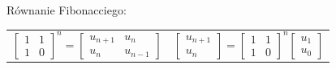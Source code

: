 \documentclass[handout]{beamer}
\theoremstyle{definition}
\theoremstyle{named}
\begin{document}
\begin{frame}{Równanie Fibonacciego:}
\begin{table}[]
\begin{tabular}{c|c}
\begin{equation*}
        \begin{bmatrix}
        1 & 1\\
        1 & 0
        \end{bmatrix}^n
        = 
        \begin{bmatrix}
        u_{n+1} & u_n\\
        u_{n} & u_{n-1}
        \end{bmatrix}

    \end{equation*}
&  
       \begin{equation*}
        \begin{bmatrix}
        u_{n+1} \\
        u_{n}
        \end{bmatrix}
        = 
        \begin{bmatrix}
        1 & 1\\
        1 & 0
        \end{bmatrix}^n
        \begin{bmatrix}
        u_1 \\
        u_0 
        \end{bmatrix}

    \end{equation*}

    \end{tabular}
\end{table}


\end{frame}
\end{document}
